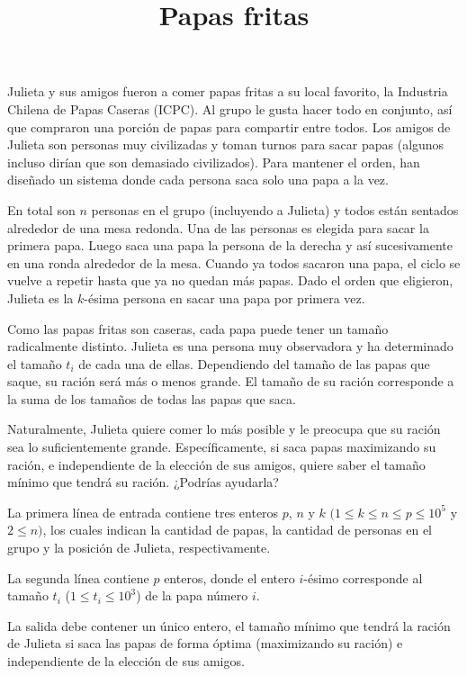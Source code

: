 \documentclass{oci}
\title{Papas fritas}
\begin{document}
\begin{problemDescription}
	Julieta y sus amigos fueron a comer papas fritas a su local favorito,
	la Industria Chilena de Papas Caseras (ICPC).
	Al grupo le gusta hacer todo en conjunto, así que compraron una porción
	de papas para compartir entre todos.
	Los amigos de Julieta son personas muy civilizadas y toman turnos para
	sacar papas (algunos incluso dirían que son demasiado civilizados).
	Para mantener el orden, han diseñado un sistema donde cada
	persona saca solo una papa a la vez.

	En total son $n$ personas en el grupo (incluyendo a Julieta) y todos están
	sentados alrededor de una mesa redonda.
	Una de las personas es elegida para sacar la primera papa.
	Luego saca una papa la persona de la derecha y así sucesivamente en una
	ronda alrededor de la mesa.
	Cuando ya todos sacaron una papa, el ciclo se vuelve a repetir hasta que ya no
	quedan más papas.
	Dado el orden que eligieron, Julieta es la $k$-ésima persona en sacar una papa
	por primera vez.

	Como las papas fritas son caseras, cada papa puede tener un tamaño radicalmente
	distinto.
	Julieta es una persona muy observadora y ha determinado el tamaño $t_i$ de cada una
	de ellas.
	Dependiendo del tamaño de las papas que saque, su ración será más o menos grande.
	El tamaño de su ración corresponde a la suma de los tamaños de todas
	las papas que saca.

	Naturalmente, Julieta quiere comer lo más posible y le preocupa que su ración
	sea lo suficientemente grande.
	Específicamente, si saca papas maximizando su ración, e independiente
	de la elección de sus amigos, quiere saber el tamaño mínimo que tendrá su ración.
	¿Podrías ayudarla?
\end{problemDescription}

\begin{inputDescription}
	La primera línea de entrada contiene tres enteros $p$, $n$ y $k$
	$(1 \leq k \leq n \leq p \leq 10^5$ y $2 \leq n)$, los cuales
	indican la cantidad de papas, la cantidad de personas en el grupo
	y la posición de Julieta, respectivamente.

	La segunda línea contiene $p$ enteros, donde el entero $i$-ésimo
	corresponde al tamaño $t_i$ ($1 \leq t_i \leq 10^3$) de la papa número $i$.
\end{inputDescription}

\begin{outputDescription}
	La salida debe contener un único entero, el tamaño mínimo que tendrá la ración
	de Julieta si saca las papas de forma óptima (maximizando su ración) e independiente
	de la elección de sus amigos.
\end{outputDescription}
\end{document}
